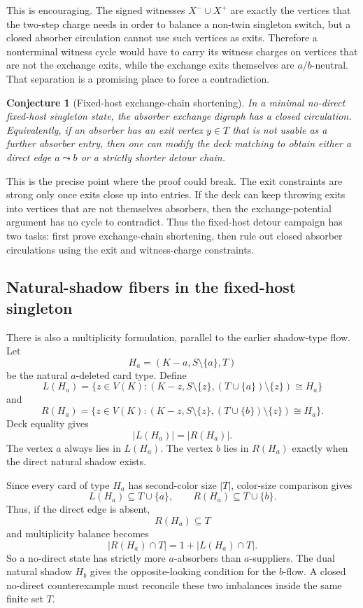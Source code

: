 \documentclass[11pt]{article}
\newtheorem{conjecture}{Conjecture}
\begin{document}
This is encouraging.  The signed witnesses \(X^-\cup X^+\) are exactly the
vertices that the two-step charge needs in order to balance a non-twin
singleton switch, but a closed absorber circulation cannot use such vertices
as exits.  Therefore a nonterminal witness cycle would have to carry its
witness charges on vertices that are not the exchange exits, while the
exchange exits themselves are \(a/b\)-neutral.  That separation is a promising
place to force a contradiction.

\begin{conjecture}[Fixed-host exchange-chain shortening]
In a minimal no-direct fixed-host singleton state, the absorber exchange
digraph has a closed circulation.  Equivalently, if an absorber has an exit
vertex \(y\in T\) that is not usable as a further absorber entry, then one can
modify the deck matching to obtain either a direct edge \(a\leadsto b\) or a
strictly shorter detour chain.
\end{conjecture}

This is the precise point where the proof could break.  The exit constraints
are strong only once exits close up into entries.  If the deck can keep
throwing exits into vertices that are not themselves absorbers, then the
exchange-potential argument has no cycle to contradict.  Thus the fixed-host
detour campaign has two tasks: first prove exchange-chain shortening, then
rule out closed absorber circulations using the exit and witness-charge
constraints.

\subsection{Natural-shadow fibers in the fixed-host singleton}

There is also a multiplicity formulation, parallel to the earlier
shadow-type flow.  Let
\[
  H_a=(K-a,S\setminus\{a\},T)
\]
be the natural \(a\)-deleted card type.  Define
\[
  L(H_a)=
  \{z\in V(K):
    (K-z,S\setminus\{z\},(T\cup\{a\})\setminus\{z\})\cong H_a
  \}
\]
and
\[
  R(H_a)=
  \{z\in V(K):
    (K-z,S\setminus\{z\},(T\cup\{b\})\setminus\{z\})\cong H_a
  \}.
\]
Deck equality gives
\[
  |L(H_a)|=|R(H_a)|.
\]
The vertex \(a\) always lies in \(L(H_a)\).  The vertex \(b\) lies in
\(R(H_a)\) exactly when the direct natural shadow exists.

Since every card of type \(H_a\) has second-color size \(|T|\), color-size
comparison gives
\[
  L(H_a)\subseteq T\cup\{a\},
  \qquad
  R(H_a)\subseteq T\cup\{b\}.
\]
Thus, if the direct edge is absent,
\[
  R(H_a)\subseteq T
\]
and multiplicity balance becomes
\[
  |R(H_a)\cap T|
  =
  1+|L(H_a)\cap T|.
\]
So a no-direct state has strictly more \(a\)-absorbers than \(a\)-suppliers.
The dual natural shadow \(H_b\) gives the opposite-looking condition for the
\(b\)-flow.  A closed no-direct counterexample must reconcile these two
imbalances inside the same finite set \(T\).
\end{document}
